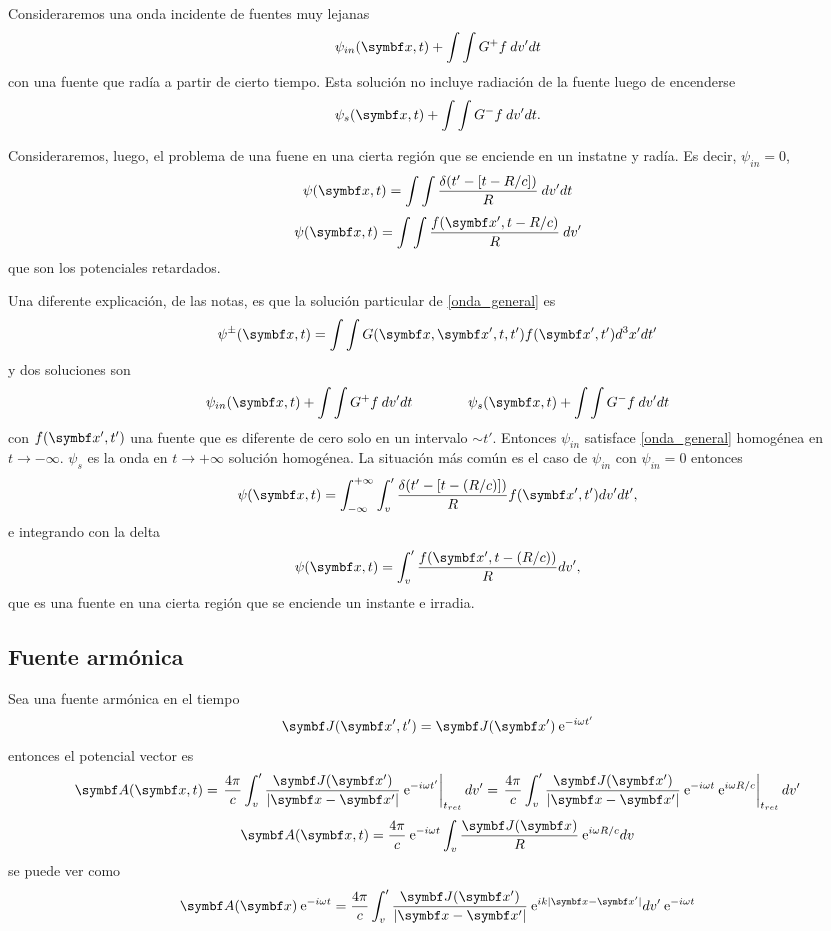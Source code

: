\documentclass[10pt,oneside]{CBFT_book}
\begin{document}
Consideraremos una onda incidente de fuentes muy lejanas
\[
	\psi_{in}(\vb{x},t) + \int\int G^+ f \: dv' dt
\]
con una fuente que radía a partir de cierto tiempo. Esta solución no incluye radiación
de la fuente luego de encenderse
\[
	\psi_{s}(\vb{x},t) + \int\int G^- f \: dv' dt.
\]

Consideraremos, luego, el problema de una fuene en una cierta región que se enciende en
un instatne y radía. Es decir, $\psi_{in} = 0$,
\[
	\psi(\vb{x},t) = \int\int \frac{\delta(t' - [ t - R/c ] )}{ R } \: dv' dt
\]
\[
	\psi(\vb{x},t) = \int\int \frac{f(\vbx',t - R/c )}{ R } \: dv'
\]
que son los potenciales retardados.

Una diferente explicación, de las notas, es que la solución particular de \eqref{onda_general} es
\[
	\psi^\pm (\vb{x},t) = \int \int G(\vb{x},\vb{x}',t,t') f(\vb{x}',t') d^3x' dt' 
\]
y dos soluciones son 
\[
	\psi_{in}(\vb{x},t) + \int\int G^+ f \: dv' dt \qquad \qquad 
	\psi_{s}(\vb{x},t) + \int\int G^- f \: dv' dt
\]
con $f(\vb{x}',t')$ una fuente que es diferente de cero solo en un intervalo $\sim t'$. Entonces $\psi_{in}$ 
satisface \eqref{onda_general} homogénea en $t \to -\infty$. $\psi_{s}$ es la onda en $t \to +\infty$ solución homogénea.
La situación más común es el caso de $\psi_{in}$ con $\psi_{in}=0$ entonces 
\[
	\psi (\vb{x},t) = \int_{-\infty}^{+\infty} \int_v' \frac{\delta(t'-[t -(R/c) ]) }{ R } 
			f(\vb{x}',t') dv' dt',
\]
e integrando con la delta
\[
	\psi (\vb{x},t) = \int_v' \frac{ f( \vb{x}', t -(R/c) ) }{ R } dv',
\]
que es una fuente en una cierta región que se enciende un instante e irradia.

\subsection{Fuente armónica}

Sea una fuente armónica en el tiempo 
\[
	\vb{J}(\vb{x}', t') = \vb{J}(\vb{x}') \euler^{-i\omega t'}
\]
entonces el potencial vector es 
\[
	\vb{A}(\vb{x}, t) = \left. \frac{4\pi}{c} \int_v' \frac{\vb{J}(\vb{x}')}{|\vb{x} - \vb{x}'|} 
	\euler^{-i\omega t'} \right|_{t_{ret}} dv' = \left. \frac{4\pi}{c} \int_v' 
	\frac{\vb{J}(\vb{x}')}{|\vb{x} - \vb{x}'|} \euler^{-i \omega t} \euler^{i \omega R/c } 
	\right|_{t_{ret}} dv'
\]
\[
	\vb{A}(\vb{x}, t) = \frac{4\pi}{c} \euler^{-i \omega t} \int_v \frac{\vb{J}(\vb{x})}{ R }
		\euler^{i \omega R/c } dv
\]
se puede ver como 
\[
	\vb{A}(\vb{x}) \euler^{-i \omega t} = \frac{4\pi}{c} \int_v' \frac{\vb{J}(\vb{x}')}{|\vb{x}-\vb{x}'|}
		\euler^{i k |\vb{x}-\vb{x}'| } dv' \euler^{-i \omega t}
\]
\end{document}
